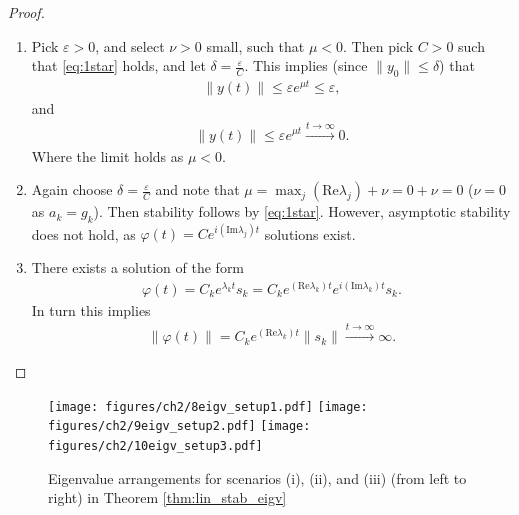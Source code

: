 \begin{proof}
	\begin{enumerate}
		\item Pick $\varepsilon > 0$, and select $\nu > 0$ small, such that $\mu <0$. Then pick $C> 0$ such that \eqref{eq:1star} holds, and let $\delta = \frac{\varepsilon}{C}$. This implies (since $\| {y} _0\| \leq \delta $) that
			\begin{align}
				\| {y} (t) \| \leq \varepsilon e^{\mu t} \leq \varepsilon,
			\end{align}
		and
		\begin{align}
			\| {y} (t) \| \leq \varepsilon e^{\mu t} \xrightarrow{t \to \infty } 0. 
		\end{align}
	Where the limit holds as $\mu < 0$.	
\item Again choose $\delta = \frac{\varepsilon}{C}$ and note that $\mu  = \max_{j} ( \textrm{Re} \lambda _j) + \nu = 0 + \nu =0$ ($\nu =0$ as $a_k = g_k$). Then stability follows by \eqref{eq:1star}. However, asymptotic stability does not hold, as $\varphi(t) = C e^{i ( \textrm{Im} \lambda _j)t} $ solutions exist.

\item There exists a solution of the form
	\begin{align}
		{	\varphi}(t) = C_k e^{\lambda _k t} {s} _k = C_k e^{( \textrm{Re}  \lambda _k)t} e ^{i ( \textrm{Im} \lambda _k)t}{s} _k.
	\end{align}
In turn this implies
\begin{align}
	\| {\varphi}(t) \| = C_k e^{( \textrm{Re} \lambda_k) t} \| {s} _k \| \xrightarrow{t \to \infty} \infty .
\end{align}

	\end{enumerate}
\end{proof}
\begin{figure}[h!]
	\centering
	\texttt{[image: figures/ch2/8eigv\_setup1.pdf]}
	\texttt{[image: figures/ch2/9eigv\_setup2.pdf]}
	\texttt{[image: figures/ch2/10eigv\_setup3.pdf]}
	\caption{Eigenvalue arrangements for scenarios (i), (ii), and (iii) (from left to right) in Theorem \ref{thm:lin_stab_eigv}}
	\label{fig:eigv_setup}
\end{figure}

